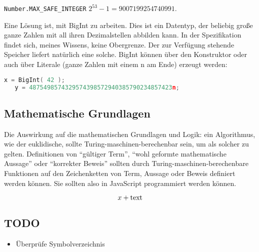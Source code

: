 \documentclass[a4paper]{amsart}
\theoremstyle{definition}
\begin{document}
{\tt Number.MAX\_SAFE\_INTEGER} $ 2^{53} - 1 = 9007199254740991$.

Eine Lösung ist, mit BigInt zu arbeiten. Dies ist ein Datentyp, der beliebig große ganze Zahlen mit all ihren Dezimalstellen abbilden kann. In der Spezifikation findet sich, meines Wissens, keine Obergrenze. Der zur Verfügung stehende Speicher liefert natürlich eine solche. BigInt können über den Konstruktor oder auch über Literale (ganze Zahlen mit einem n am Ende) erzeugt werden:

\begin{lstlisting}[language=c]
   x = BigInt( 42 );
   y = 4875498574329574398572940385790234857423n;
\end{lstlisting}

\subsection{Mathematische Grundlagen}
Die Auswirkung auf die mathematischen Grundlagen und Logik: ein Algorithmus, wie der euklidische, sollte Turing-maschinen-berechenbar sein, um als solcher zu gelten. Definitionen von "`gültiger Term"', "`wohl geformte mathematische Aussage"' oder "`korrekter Beweis"' sollten durch Turing-maschinen-berechenbare Funktionen auf den Zeichenketten von Term, Aussage oder Beweis definiert werden können. Sie sollten also in JavaScript programmiert werden können.

\begin{equation}
   x + \hbox{text}
\end{equation}

\begin{backup}
\section{TODO}
\begin{itemize}
     \item Überprüfe Symbolverzeichnis
\end{itemize}


\end{backup}
\end{document}
